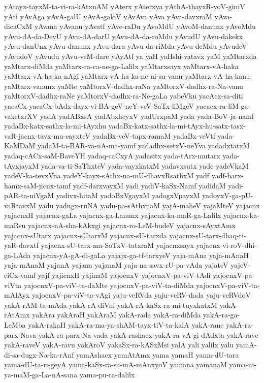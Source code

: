 {yAtayx-tayxM-ta-vi-ra-kAtxnAM
yAterx
yAterxya
yAthA-thayxR-yoV-giniV
yAti
yAvAga
yAvA-galU
yAvA-galoV
yAvAva
yAva
yAva-davxraM
yAva-dicaCxM
yAvana
yAvanu
yAvatf
yAve-raDu
yAvoMdU
yAvoM-danunx
yAvoMdu
yAvu-dA-da-DeyU
yAvu-dA-darU
yAvu-dA-da-roMdu
yAvudU
yAvu-dakekx
yAvu-danUnx
yAvu-danunx
yAvu-dara
yAvu-da-riMda
yAvu-deMdu
yAvudeV
yAvudoV
yAvudu
yAvu-veM-dare
yAyAtf
ya
yaH
yaHshi-vatavx
yaM
yaMtarxda
yaMtarx-diMda
yaMtarx-ra-ca-ne-ga-Lalilx
yaMtarxsayx
yaMtarx-vA-haka
yaMtarx-vA-ha-ka-nAgi
yaMtarx-vA-ha-ka-ne-ni-su-vanu
yaMtarx-vA-ha-kanu
yaMtarx-vanunx
yaMte
yaMtorxV-dadhx-raNa
yaMtorxV-dadhx-ra-Na-vanu
yaMtorxV-dadhx-raNe
yaMtorxV-dadhx-ra-Ne-gaLa
yabeVku
yacAcx-sa-diti
yacaCx
yacaCx-bAdx-dayx-vi-BA-geV-neY-veV-SaTx-liMgeV
yacacx-ra-liM-ga-vaketxrXV
yadA
yadABxsA
yadAbxheyxV
yadUrxpaM
yada
yada-BoV-ja-namf
yadaBx-katx-sathx-la-mi-tAyxhu
yadaBx-katx-sathx-la-mi-tAyx-hu-satx-tasx-vaR-jacnx-tavx-mu-cayxteV
yadaBx-veV-tapx-ramaM
yadaBx-veVtf
yada-KaMDaM
yadaM-ta-BAR-va-nA-ma-yamf
yadadhx-setxV-neYva
yadadxtatxM
yadaq-cACx-saM-BaveYH
yadaq-caCxyA
yadasitx
yada-tArx-mutarx
yada-tAyxjayxM
yada-va-ti-SaThxteV
yada-vayxkatxM
yadavxsutx
yade
yadeVkaM
yadeV-ka-tevxVna
yadeY-kayx-sAthx-na-mU-dhavxRsathxM
yadf
yadf-barx-hamx-saM-jicnx-tamf
yadf-darxvayxM
yadi
yadiV-kaSx-Namf
yadidaM
yadi-pAR-ta-niVgaM
yadivx-hitaM
yadoBxVgayxM
yadogxVpayxM
yadoyxV-ga-pU-vaRtavxM
yadu
yadugx-ruNA
yadu-pa-sAthxnaM
yajA-maheV
yajaMteV
yajacnx
yajacnxH
yajacnx-gaLa
yajacnx-ga-Lanunx
yajacnx-ka-maR-ga-Lalilx
yajacnx-ka-maRsu
yajacnx-nA-sha-kAkxgi
yajacnx-ro-LeM-budeV
yajacnx-sAyxtAmx
yajacnx-sUtarx
yajacnx-sUtarxM
yajacnx-sU-tarxda
yajacnx-sU-tarx-dhaq-ti-yaR-davxtf
yajacnx-sU-tarx-ma-SoTxV-tatxraM
yajacnxsayx
yajacnx-vi-roV-dhi-ga-LAda
yajacnx-yA-gA-di-gaLa
yajajx-ga-tf-tarxyeV
yaja-mAna
yaja-mAnaH
yaja-mAnaM
yajanA
yajana
yajanaM
yaja-na-savx-rU-pa-vAda
yajateV
yajeV-ciCx-vamf
yajf
yajicnxH
yajinaM
yajocnxV
yajocnxV-pa-viV-tAdi
yajocnxV-pa-viVta
yajocnxV-pa-viV-ta-daMte
yajocnxV-pa-viV-ta-diMda
yajocnxV-pa-viV-ta-mAlAyx
yajocnxV-pa-viV-ta-vAgi
yaju-veRVda
yaju-veRV-dada
yaju-veRVdoV
yakA-rAM-ta-mAda
yakA-rA-diVni
yakA-rA-kaSx-ra-mi-tuyxkatxM
yakA-rAtAmx
yakAra
yakAraH
yakAraM
yakA-rada
yakA-ra-diMda
yakA-ra-ga-LeMba
yakA-rakaH
yakA-ra-ma-ya-shAM-tayx-tiV-ta-kalA
yakA-rane
yakA-ra-parx-Nava
yakA-ra-parx-Na-vada
yakA-rashacx
yakA-ra-vA-gi-dAdxta
yakA-rave
yakA-raveV
yakA-ravu
yakAroV
yakaSx-ra-kASxMsi
yalA
yali
yalilx
yalu
yamA-di-sa-dugx-Na-ka-rAnf
yamAshacx
yamAtAmx
yama
yamaH
yama-dU-tara
yama-dU-ta-ri-geyA
yama-kaSx-ra-sa-mA-mAnxyoV
yamana
yamanaM
yama-ni-ya-maM-ga-La-nA-sana
yama-pu-ra-dalilx
}
